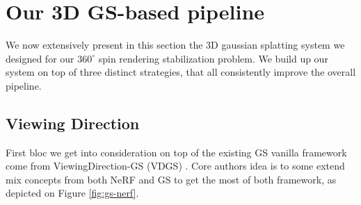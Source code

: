 \section{Our 3D GS-based pipeline}
We now extensively present in this section the 3D gaussian splatting system we designed for our $360^{\circ}$ spin rendering stabilization problem. We build up our system on top of three distinct strategies, that all consistently improve the overall pipeline. 

\subsection{Viewing Direction}
First bloc we get into consideration on top of the existing GS vanilla framework come from ViewingDirection-GS (VDGS) \citep{malarz2023gaussian}. Core authors idea is to some extend mix concepts from both NeRF and GS to get the most of both framework, as depicted on Figure \ref{fig:gs-nerf}. 

